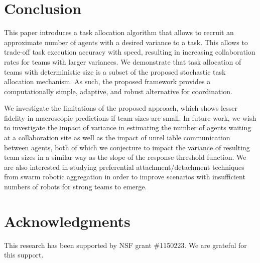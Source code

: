 \documentclass{svmult}  %
\begin{document}
\section{Conclusion}\label{sec:conclusion}
This paper introduces a task allocation algorithm that allows to recruit an approximate number of agents with a desired variance to a task. This allows to trade-off task execution accuracy with speed, resulting in increasing collaboration rates for teams with larger variances. 
We demonstrate that task allocation of teams with deterministic size is a subset of the proposed stochastic task allocation mechanism. As such, the proposed framework provides a computationally simple, adaptive, and robust alternative for coordination.

We investigate the limitations of the proposed approach, which shows lesser fidelity in macroscopic predictions if team sizes are small. In future work, we wish to investigate the impact of variance in estimating the number of agents waiting at a collaboration site as well as the impact of unrel iable communication between agents, both of which we conjecture to impact the variance of resulting team sizes in a similar way as the slope of the response threshold function. We are also interested in studying preferential attachment/detachment techniques from swarm robotic aggregation in order to improve scenarios with insufficient numbers of robots for strong teams to emerge. 

\section*{Acknowledgments}
This research has been supported by NSF grant \#1150223. We are grateful for this support.


\end{document}
